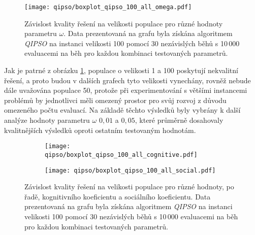 \begin{figure}[ht!]
    \centering
    \texttt{[image: qipso/boxplot\_qipso\_100\_all\_omega.pdf]}
    \caption{Závislost kvality řešení na velikosti populace pro různé hodnoty parametru $\omega$. Data prezentovaná na grafu byla získána algoritmem \emph{QIPSO} na instanci velikosti 100 pomocí 30 nezávislých běhů s 10\,000 evaluacemi na běh pro každou kombinaci testovaných parametrů.}
    \label{fig:qipso-100-all-omega}
\end{figure}

Jak je patrné z obrázku \ref{fig:qipso-100-all-omega}, populace o velikosti 1 a 100 poskytují nekvalitní řešení, a proto budou v dalších grafech tyto velikosti vynechány, rovněž nebude dále uvažována populace 50, protože při experimentování s většími instancemi problémů by jednotlivci měli omezený prostor pro svůj rozvoj z důvodu omezeného počtu evaluací. 
Na základě těchto výsledků byly vybrány k další analýze hodnoty parametru $\omega$ $0,01$ a $0,05$, které průměrně dosahovaly kvalitnějších výsledků oproti ostatním testovaným hodnotám.

\begin{figure}
    \centering
    \begin{subfigure}[b]{0.48\textwidth}
        \texttt{[image: qipso/boxplot\_qipso\_100\_all\_cognitive.pdf]}
    \end{subfigure}
    \hfill
    \begin{subfigure}[b]{0.48\textwidth}
        \texttt{[image: qipso/boxplot\_qipso\_100\_all\_social.pdf]}
    \end{subfigure}    
    \caption{Závislost kvality řešení na velikosti populace pro různé hodnoty, po řadě, kognitivního koeficientu a sociálního koeficientu. Data prezentovaná na grafu byla získána algoritmem \emph{QIPSO} na instanci velikosti 100 pomocí 30 nezávislých běhů s 10\,000 evaluacemi na běh pro každou kombinaci testovaných parametrů.}
    \label{fig:qipso-100-all-koeficients}
\end{figure}

